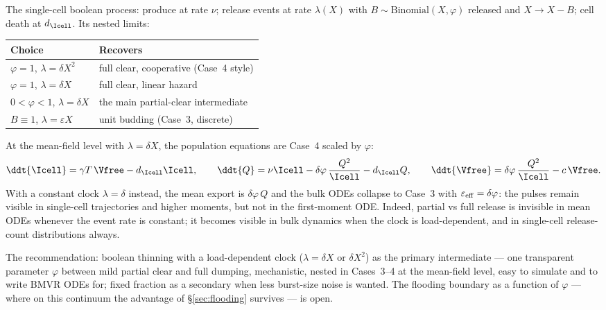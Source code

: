 The single-cell boolean process: produce at rate $\nu$; release events at
rate $\lambda(X)$ with $B\sim\mathrm{Binomial}(X,\varphi)$ released and $X\to
X-B$; cell death at $d_{\Icell}$. Its nested limits:
\begin{center}
\renewcommand{\arraystretch}{1.2}
\small
\begin{tabular}{@{}ll@{}}
\toprule
Choice & Recovers \\
\midrule
$\varphi=1$, $\lambda=\delta X^2$ & full clear, cooperative (Case~4 style) \\
$\varphi=1$, $\lambda=\delta X$ & full clear, linear hazard \\
$0<\varphi<1$, $\lambda=\delta X$ & the main partial-clear intermediate \\
$B\equiv1$, $\lambda=\varepsilon X$ & unit budding (Case~3, discrete) \\
\bottomrule
\end{tabular}
\end{center}
At the mean-field level with $\lambda=\delta X$, the population equations
are Case~4 scaled by $\varphi$:
\begin{equation}
\ddt{\Icell}=\gamma T\,\Vfree-d_{\Icell}\Icell,
\qquad
\ddt{Q}=\nu\Icell-\delta\varphi\,\frac{Q^2}{\Icell}-d_{\Icell}Q,
\qquad
\ddt{\Vfree}=\delta\varphi\,\frac{Q^2}{\Icell}-c\,\Vfree.
\end{equation}
With a constant clock $\lambda=\delta$ instead, the mean export is
$\delta\varphi\,Q$ and the bulk ODEs collapse to Case~3 with
$\varepsilon_{\rm eff}=\delta\varphi$: the pulses remain visible in single-cell
trajectories and higher moments, but not in the first-moment ODE. Indeed,
partial vs full release is invisible in mean ODEs whenever the event rate
is constant; it becomes visible in bulk dynamics when the clock is
load-dependent, and in single-cell release-count distributions always.

The recommendation: boolean thinning with a load-dependent clock
($\lambda=\delta X$ or $\delta X^2$) as the primary intermediate --- one
transparent parameter $\varphi$ between mild partial clear and full dumping,
mechanistic, nested in Cases~3--4 at the mean-field level, easy to simulate
and to write BMVR ODEs for; fixed fraction as a secondary when less
burst-size noise is wanted. The flooding boundary as a function of $\varphi$ ---
where on this continuum the advantage of \S\ref{sec:flooding} survives ---
is open.
